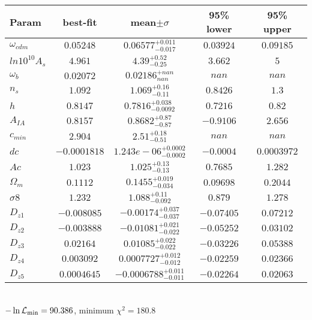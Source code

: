 \begin{tabular}{|l|c|c|c|c|} 
 \hline 
Param & best-fit & mean$\pm\sigma$ & 95\% lower & 95\% upper \\ \hline 
$\omega_{cdm }$ &$0.05248$ & $0.06577_{-0.017}^{+0.011}$ & $0.03924$ & $0.09185$ \\ 
$ln10^{10}A_{s }$ &$4.961$ & $4.39_{-0.25}^{+0.52}$ & $3.662$ & $5$ \\ 
$\omega_{b }$ &$0.02072$ & $0.02186_{nan}^{+nan}$ & $nan$ & $nan$ \\ 
$n_{s }$ &$1.092$ & $1.069_{-0.11}^{+0.16}$ & $0.8426$ & $1.3$ \\ 
$h$ &$0.8147$ & $0.7816_{-0.0092}^{+0.038}$ & $0.7216$ & $0.82$ \\ 
$A_{IA }$ &$0.8157$ & $0.8682_{-0.87}^{+0.87}$ & $-0.9106$ & $2.656$ \\ 
$c_{min }$ &$2.904$ & $2.51_{-0.51}^{+0.18}$ & $nan$ & $nan$ \\ 
$dc$ &$-0.0001818$ & $1.243e-06_{-0.0002}^{+0.0002}$ & $-0.0004$ & $0.0003972$ \\ 
$Ac$ &$1.023$ & $1.025_{-0.13}^{+0.13}$ & $0.7685$ & $1.282$ \\ 
$\Omega_{m }$ &$0.1112$ & $0.1455_{-0.034}^{+0.019}$ & $0.09698$ & $0.2044$ \\ 
$\sigma8$ &$1.232$ & $1.088_{-0.092}^{+0.11}$ & $0.879$ & $1.278$ \\ 
$D_{z1 }$ &$-0.008085$ & $-0.00174_{-0.037}^{+0.037}$ & $-0.07405$ & $0.07212$ \\ 
$D_{z2 }$ &$-0.003888$ & $-0.01081_{-0.022}^{+0.021}$ & $-0.05252$ & $0.03102$ \\ 
$D_{z3 }$ &$0.02164$ & $0.01085_{-0.022}^{+0.022}$ & $-0.03226$ & $0.05388$ \\ 
$D_{z4 }$ &$0.003092$ & $0.0007727_{-0.012}^{+0.012}$ & $-0.02259$ & $0.02366$ \\ 
$D_{z5 }$ &$0.0004645$ & $-0.0006788_{-0.011}^{+0.011}$ & $-0.02264$ & $0.02063$ \\ 
\hline 
 \end{tabular} \\ 
$-\ln{\cal L}_\mathrm{min} =90.386$, minimum $\chi^2=180.8$ \\ 

